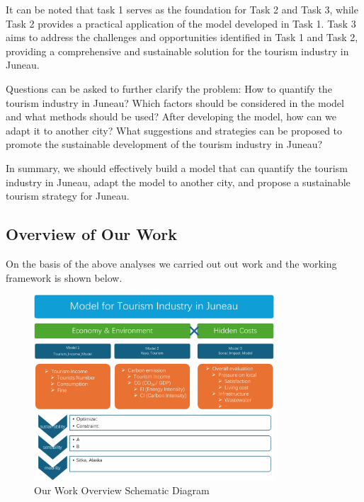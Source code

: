 It can be noted that task 1 serves as the foundation for Task 2 and Task 3, 
while Task 2 provides a practical application of the model developed in Task 1. 
Task 3 aims to address the challenges and opportunities identified in Task 1 and Task 2, 
providing a comprehensive and sustainable solution for the tourism industry in Juneau.

Questions can be asked to further clarify the problem:
How to quantify the tourism industry in Juneau? Which factors should be 
considered in the model and what methods should be used? After developing 
the model, how can we adapt it to another city? What suggestions and 
strategies can be proposed to promote the sustainable development of the
tourism industry in Juneau?

In summary, we should effectively build a model that can quantify the tourism
industry in Juneau, adapt the model to another city, and propose a sustainable
tourism strategy for Juneau.


\subsection{Overview of Our Work}

On the basis of the above analyses we carried out out work and the 
working framework is shown below.

\begin{figure}[H]
    \centering
    \includegraphics[width=0.8\textwidth]{Framework.png} %
    \caption{Our Work Overview Schematic Diagram}
\end{figure}

